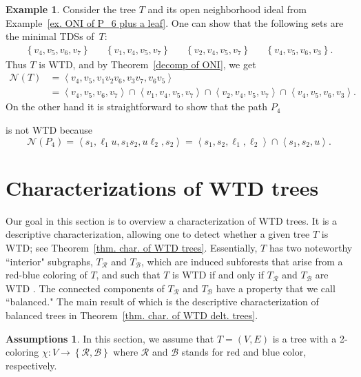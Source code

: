 \documentclass[12pt, reqno]{amsart}
\theoremstyle{definition}
\newtheorem*{assumptions}{Assumptions}
\theoremstyle{plain}
\theoremstyle{definition}
\newtheorem{example}[theorem]{Example}
\newcommand{\R}{\mathcal{R}}
\newcommand{\B}{\mathcal{B}}
\newcommand\gen[1]{\left\langle #1 \right\rangle}
\newcommand\set[1]{\left\lbrace #1 \right\rbrace}
\newcommand{\NN}{\mathcal{N}}
\begin{document}
\begin{example}
\label{ex. Path with 6 vert.}
Consider the tree $T$ and its open neighborhood ideal from Example~\ref{ex. ONI of P_6 plus a leaf}.
One can show that the following sets are the minimal TDSs of~$T$:
\begin{align*}
    \set{v_4,v_5,v_6,v_7} & & \set{v_1,v_4,v_5,v_7} & & \set{v_2,v_4,v_5,v_7} & & \set{v_4,v_5,v_6,v_3}.  
\end{align*}
Thus $T$ is WTD, and by Theorem~\ref{decomp of ONI}, we get
\begin{align*}
    \NN(T) &= \gen{v_4,v_5,v_1v_2v_6,v_3v_7, v_6v_5}\\
    &= \gen{v_4,v_5,v_6,v_7} \cap \gen{v_1,v_4,v_5,v_7} \cap \gen{v_2,v_4,v_5,v_7} \cap \gen{v_4,v_5,v_6,v_3}.
\end{align*}
On the other hand it is straightforward to show that the path $P_4$
\begin{center}
\end{center}
is not WTD because
\[    
\NN(P_4) = \gen{s_1, \ell_1u, s_1s_2, u\ell_2, s_2} = \gen{s_1,s_2,\ell_1,\ell_2} \cap \gen{s_1,s_2,u}.
\]
\end{example}

\section{Characterizations of WTD trees}
\label{sec241204b}

Our goal in this section is to overview a characterization of WTD trees.
It is a descriptive characterization, allowing one to detect whether a given tree $T$ is WTD; see Theorem~\ref{thm. char. of WTD trees}.
Essentially, $T$ has two noteworthy ``interior" subgraphs, $T_\R$ and $T_\B$, which are induced subforests that arise from a red-blue coloring of $T$, and such that $T$ is WTD if and only if $T_\R$ and $T_\B$ are WTD \cite[Corollary 5.8]{COURAGE_GT}.
The connected components of $T_\R$ and $T_\B$ have a property that we call ``balanced."
The main result of which is the descriptive characterization of balanced trees in Theorem~\ref{thm. char. of WTD delt. trees}.

\begin{assumptions}
In this section, we assume that $T = (V,E)$ is a tree with a 2-coloring $\chi: V \to \set{\R,\B}$ where $\R$ and $\B$ stands for red and blue color, respectively.
\end{assumptions}
\end{document}
